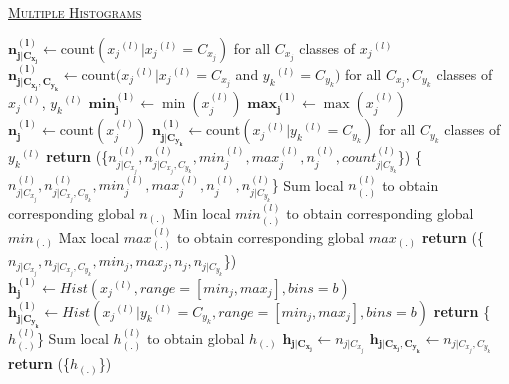 \documentclass[10pt]{article}
\begin{document}
\begin{algorithm}
	\caption{\underline{\textsc{Multiple Histograms}}}
	\label{Multiple_Histograms}
	\begin{algorithmic}[1] %
		 
					\State $\mathbf{n_{j|C_{x_j}}^{(l)}} \gets \text{count}({x_{j}}^{(l)}|{x_{j}}^{(l)}=C_{x_j})$ for all $C_{x_j}$ classes of ${x_{j}}^{(l)}$
						\State $\mathbf{n_{j|{C_{x_j},C_{y_k}}}^{(l)}} \gets \text{count}({x_{j}}^{(l)}|{x_{j}}^{(l)}=C_{x_j}$ and ${y_{k}}^{(l)}=C_{y_k})$  for all $C_{x_j},C_{y_k}$ classes of ${x_{j}}^{(l)}$, ${y_{k}}^{(l)}$
					\EndFor
			\EndFor
					\State $\mathbf{min_j^{(l)}} \gets \min(x_j^{(l)})$
					\State $\mathbf{max_j^{(l)}} \gets \max(x_j^{(l)})$
					\State $\mathbf{n_j^{(l)}} \gets \text{count}(x_j^{(l)})$
						\State $\mathbf{n_{j|C_{y_k}}^{(l)}} \gets \text{count}({x_{j}}^{(l)}|{y_{k}}^{(l)}=C_{y_k})$ for all $C_{y_k}$ 
						classes of ${y_{k}}^{(l)}$
					\EndFor
			\EndFor
			\State \textbf{return} (\{$  {n}_{j|C_{x_j}}^{(l)} ,{n}_{j|{C_{x_j},C_{y_k}}}^{(l)},{min}_j^{(l)},{max}_j^{(l)} ,{n}_j^{(l)},{count}_{j|C_{y_k}}^{(l)} $\})
		\EndProcedure
		\State {}
		 {\{$  {n}_{j|C_{x_j}}^{(l)} ,{n}_{j|{C_{x_j},C_{y_k}}}^{(l)},{min}_j^{(l)},{max}_j^{(l)} ,{n}_j^{(l)},{n}_{j|C_{y_k}}^{(l)} $\}}
			\State Sum local $n_{(.)}^{(l)}$ to obtain corresponding global $n_{(.)}$
			\State Min local $min_{(.)}^{(l)}$ to obtain corresponding global $min_{(.)}$
			\State Max local $max_{(.)}^{(l)}$ to obtain corresponding global $max_{(.)}$
			\State \textbf{return} ({\{$ {n}_{j|C_{x_j}},{n}_{j|{C_{x_j},C_{y_k}}},min_j,max_j,n_j,n_{j|C_{y_k}} $\}})
		\EndProcedure
		\State {}
		 
				\State $\mathbf{h_{j}^{(l)}} \gets  Hist({x_j}^{(l)}, range = [min_j,max_j], bins =b)$  
									\State{}
					\State $\mathbf{h_{j|C_{y_k}}^{(l)}} \gets  Hist({x_{j}}^{(l)}|{y_{k}}^{(l)}=C_{y_k}, range = [min_j,max_j], bins =b)$  
				\EndFor
			\EndFor
			\State \textbf{return} \{${h}_{(.)}^{(l)}$\}
		\EndProcedure
		\State {}
				\State Sum local ${h}_{(.)}^{(l)}$ to obtain global $ h_{(.)}$
			\EndFor
					\State $\mathbf{h_{j|C_{x_j}}} \gets {n}_{j|C_{x_j}}$
						\State $\mathbf{h_{j|{C_{x_j},C_{y_k}}}} \gets {n}_{j|{C_{x_j},C_{y_k}}}$
					\EndFor
			\EndFor
			\State \textbf{return} (\{$ h_{(.)}$\})
		\EndProcedure
	\end{algorithmic}
\end{algorithm}
\end{document}
